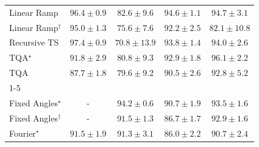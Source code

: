 \begin{tabular}{l|cccc|}
Linear Ramp & {\cellcolor[HTML]{882F05}} \color[HTML]{F1F1F1} $96.4\pm 0.9$ & {\cellcolor[HTML]{FEB340}} \color[HTML]{000000} $82.6\pm 9.6$ & {\cellcolor[HTML]{A13804}} \color[HTML]{F1F1F1} $94.6\pm 1.1$ & {\cellcolor[HTML]{A03704}} \color[HTML]{F1F1F1} $94.7\pm 3.1$ \\
Linear Ramp$^\dagger$ & {\cellcolor[HTML]{9B3504}} \color[HTML]{F1F1F1} $95.0\pm 1.3$ & {\cellcolor[HTML]{FFEFAC}} \color[HTML]{000000} $75.6\pm 7.6$ & {\cellcolor[HTML]{C44802}} \color[HTML]{F1F1F1} $92.2\pm 2.5$ & {\cellcolor[HTML]{FEBA46}} \color[HTML]{000000} $82.1\pm 10.8$ \\
Recursive TS & {\cellcolor[HTML]{782A05}} \color[HTML]{F1F1F1} $97.4\pm 0.9$ & {\cellcolor[HTML]{FFFFE5}} \color[HTML]{000000} $70.8\pm 13.9$ & {\cellcolor[HTML]{AC3D03}} \color[HTML]{F1F1F1} $93.8\pm 1.4$ & {\cellcolor[HTML]{AB3C03}} \color[HTML]{F1F1F1} $94.0\pm 2.6$ \\
TQA$^\star$ & {\cellcolor[HTML]{CB4B02}} \color[HTML]{F1F1F1} $91.8\pm 2.9$ & {\cellcolor[HTML]{FEC859}} \color[HTML]{000000} $80.8\pm 9.3$ & {\cellcolor[HTML]{BB4403}} \color[HTML]{F1F1F1} $92.9\pm 1.8$ & {\cellcolor[HTML]{8B3005}} \color[HTML]{F1F1F1} $96.1\pm 2.2$ \\
TQA & {\cellcolor[HTML]{EE7617}} \color[HTML]{F1F1F1} $87.7\pm 1.8$ & {\cellcolor[HTML]{FED36F}} \color[HTML]{000000} $79.6\pm 9.2$ & {\cellcolor[HTML]{D75908}} \color[HTML]{F1F1F1} $90.5\pm 2.6$ & {\cellcolor[HTML]{BC4503}} \color[HTML]{F1F1F1} $92.8\pm 5.2$ \\
\cline{1-5}
\multicolumn{5}{c}{\rule{0pt}{8pt}PP} \\
\midrule
Fixed Angles$^\star$ & {\cellcolor[HTML]{000000}} \color[HTML]{F1F1F1} {\cellcolor{white}} \color{black} - & {\cellcolor[HTML]{0A703A}} \color[HTML]{F1F1F1} $94.2\pm 0.6$ & {\cellcolor[HTML]{2C8F4B}} \color[HTML]{F1F1F1} $90.7\pm 1.9$ & {\cellcolor[HTML]{11753D}} \color[HTML]{F1F1F1} $93.5\pm 1.6$ \\
Fixed Angles$^\dagger$ & {\cellcolor[HTML]{000000}} \color[HTML]{F1F1F1} {\cellcolor{white}} \color{black} - & {\cellcolor[HTML]{258745}} \color[HTML]{F1F1F1} $91.5\pm 1.3$ & {\cellcolor[HTML]{5AB76A}} \color[HTML]{F1F1F1} $86.7\pm 1.7$ & {\cellcolor[HTML]{177B3F}} \color[HTML]{F1F1F1} $92.9\pm 1.6$ \\
Fourier$^\star$ & {\cellcolor[HTML]{258745}} \color[HTML]{F1F1F1} $91.5\pm 1.9$ & {\cellcolor[HTML]{268846}} \color[HTML]{F1F1F1} $91.3\pm 3.1$ & {\cellcolor[HTML]{64BC6F}} \color[HTML]{F1F1F1} $86.0\pm 2.2$ & {\cellcolor[HTML]{2C8F4B}} \color[HTML]{F1F1F1} $90.7\pm 2.4$ \\

\end{tabular}
